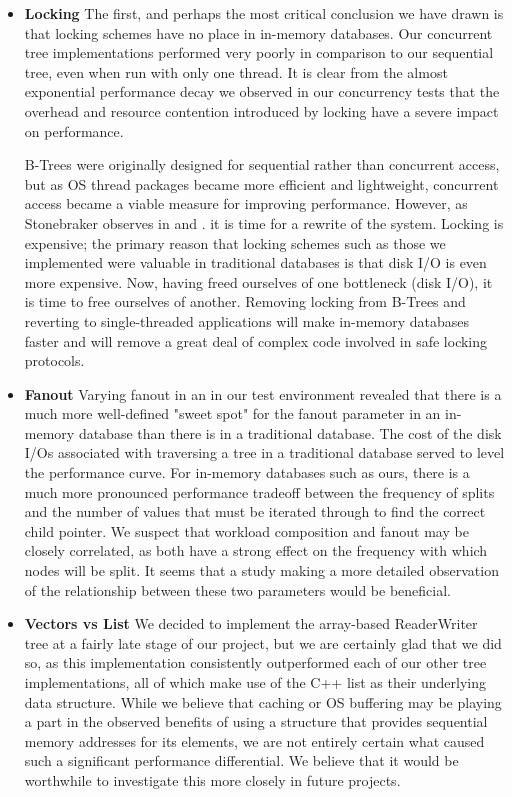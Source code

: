 \documentclass{sig-alternate}
\begin{document}
\begin{itemize}
\item \textbf{Locking} The first, and perhaps the most critical conclusion we have drawn is that locking schemes have no place in in-memory databases. Our concurrent tree implementations performed very poorly in comparison to our sequential tree, even when run with only one thread. It is clear from the almost exponential performance decay we observed in our concurrency tests that the overhead and resource contention introduced by locking have a severe impact on performance.

B-Trees were originally designed for sequential rather than concurrent access, but as OS thread packages became more efficient and lightweight, concurrent access became a viable measure for improving performance. However, as Stonebraker observes in \cite{stone:oltp} and \cite{stone:era}. it is time for a rewrite of the system. Locking is expensive; the primary reason that locking schemes such as those we implemented were valuable in traditional databases is that disk I/O is even more expensive. Now, having freed ourselves of one bottleneck (disk I/O), it is time to free ourselves of another. Removing locking from B-Trees and reverting to single-threaded applications will make in-memory databases faster and will remove a great deal of complex code involved in safe locking protocols.

\item \textbf{Fanout} Varying fanout in an in our test environment revealed that there is a much more well-defined "sweet spot" for the fanout parameter in an in-memory database than there is in a traditional database. The cost of the disk I/Os associated with traversing a tree in a traditional database served to level the performance curve. For in-memory databases such as ours, there is a much more pronounced performance tradeoff between the frequency of splits and the number of values that must be iterated through to find the correct child pointer. We suspect that workload composition and fanout may be closely correlated, as both have a strong effect on the frequency with which nodes will be split. It seems that a study making a more detailed observation of the relationship between these two parameters would be beneficial.

\item \textbf{Vectors vs List} We decided to implement the array-based ReaderWriter tree at a fairly late stage of our project, but we are certainly glad that we did so, as this implementation consistently outperformed each of our other tree implementations, all of which make use of the C++ list as their underlying data structure. While we believe that caching or OS buffering may be playing a part in the observed benefits of using a structure that provides sequential memory addresses for its elements, we are not entirely certain what caused such a significant performance differential. We believe that it would be worthwhile to investigate this more closely in future projects.


\end{itemize}
\end{document}
